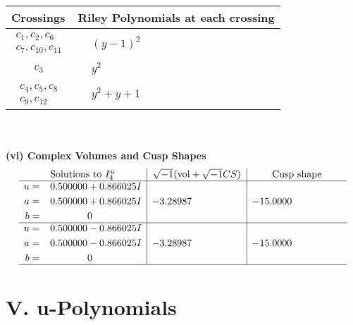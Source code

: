 \documentclass[1p]{elsarticle_modified}
\theoremstyle{definition}
\newcommand{\I}{\sqrt{-1}}
\begin{document}
\begin{tabular}{m{50pt}|m{274pt}}
Crossings & \hspace{64pt}Riley Polynomials at each crossing \\
\hline $$\begin{aligned}c_{1},c_{2},c_{6}\\c_{7},c_{10},c_{11}\end{aligned}$$&$\begin{aligned}
&(y-1)^2
\end{aligned}$\\
\hline $$\begin{aligned}c_{3}\end{aligned}$$&$\begin{aligned}
&y^2
\end{aligned}$\\
\hline $$\begin{aligned}c_{4},c_{5},c_{8}\\c_{9},c_{12}\end{aligned}$$&$\begin{aligned}
&y^2+y+1
\end{aligned}$\\
\hline
\end{tabular}\\~\\
\newpage\flushleft \textbf{(vi) Complex Volumes and Cusp Shapes}
$$\begin{array}{c|c|c}  
\text{Solutions to }I^u_{4}& \I (\text{vol} + \sqrt{-1}CS) & \text{Cusp shape}\\
 \hline 
\begin{aligned}
u &= \phantom{-}0.500000 + 0.866025 I \\
a &= \phantom{-}0.500000 + 0.866025 I \\
b &= \phantom{-0.000000 } 0\end{aligned}
 & -3.28987\phantom{ +0.000000I} & -15.0000\phantom{ +0.000000I} \\ \hline\begin{aligned}
u &= \phantom{-}0.500000 - 0.866025 I \\
a &= \phantom{-}0.500000 - 0.866025 I \\
b &= \phantom{-0.000000 } 0\end{aligned}
 & -3.28987\phantom{ +0.000000I} & -15.0000\phantom{ +0.000000I}\\
 \hline 
 \end{array}$$\newpage
\newpage\renewcommand{\arraystretch}{1}
\centering \section*{ V. u-Polynomials}
\end{document}
